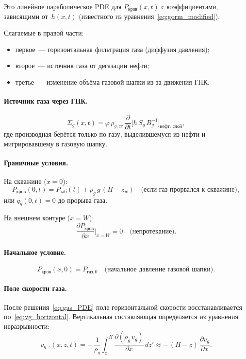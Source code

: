 \documentclass[12pt,a4paper]{article}
\begin{document}
Это линейное параболическое PDE для $P_{\text{кров}}(x,t)$
с коэффициентами, зависящими от~$h(x,t)$ (известного из
уравнения~\eqref{eq:gorm_modified}).

Слагаемые в правой части:
\begin{itemize}[nosep]
  \item первое~--- горизонтальная фильтрация газа (диффузия давления);
  \item второе~--- источник газа от дегазации нефти;
  \item третье~--- изменение объёма газовой шапки из-за движения ГНК.
\end{itemize}

\paragraph{Источник газа через ГНК.}
\begin{equation}\label{eq:Sigma_g}
  \Sigma_g(x,t) = \varphi\,\rho_{g,\text{ст}}\,
    \frac{\partial}{\partial t}
    \bigl[h\,S_g\,B_g^{-1}\bigr]_{\text{нефт.\ слой}},
\end{equation}
где производная берётся только по газу, выделившемуся из нефти и
мигрировавшему в газовую шапку.

\paragraph{Граничные условия.}
На скважине ($x = 0$):
\begin{equation}\label{eq:gas_BC_well}
  P_{\text{кров}}(0, t) = P_{\text{заб}}(t)
    + \rho_g\,g\,(H - z_w)
  \quad\text{(если газ прорвался к скважине)},
\end{equation}
или $q_g(0,t) = 0$ до прорыва газа.

На внешнем контуре ($x = W$):
\begin{equation}\label{eq:gas_BC_outer}
  \frac{\partial P_{\text{кров}}}{\partial x}\bigg|_{x=W} = 0
  \quad\text{(непротекание)}.
\end{equation}

\paragraph{Начальное условие.}
\begin{equation}\label{eq:gas_IC}
  P_{\text{кров}}(x, 0) = P_{\text{газ},0}
  \quad\text{(начальное давление газовой шапки)}.
\end{equation}

\paragraph{Поле скорости газа.}
После решения~\eqref{eq:gas_PDE} поле горизонтальной скорости
восстанавливается по~\eqref{eq:vg_horizontal}. Вертикальная
составляющая определяется из уравнения неразрывности:
\begin{equation}\label{eq:vg_z_from_cont}
  v_{g,z}(x,z,t) = -\,\frac{1}{\rho_g}
    \int_z^{H} \frac{\partial(\rho_g\,v_g)}{\partial x}\,dz'
    \approx -\,(H-z)\,\frac{\partial v_g}{\partial x}.
\end{equation}
\end{document}
